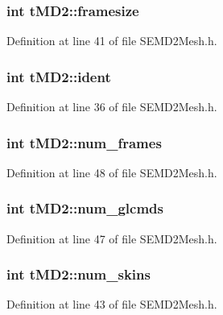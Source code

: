\subsubsection[{framesize}]{\setlength{\rightskip}{0pt plus 5cm}int t\+M\+D2\+::framesize}\label{structt_m_d2_ac5457d8a812a9b0cee6e4754f7fee091}


Definition at line 41 of file S\+E\+M\+D2\+Mesh.\+h.

\subsubsection[{ident}]{\setlength{\rightskip}{0pt plus 5cm}int t\+M\+D2\+::ident}\label{structt_m_d2_a7db5b4e818f796969146d4de078a2a7c}


Definition at line 36 of file S\+E\+M\+D2\+Mesh.\+h.

\subsubsection[{num\+\_\+frames}]{\setlength{\rightskip}{0pt plus 5cm}int t\+M\+D2\+::num\+\_\+frames}\label{structt_m_d2_aa59b41d7ca2f8f41725667978764e446}


Definition at line 48 of file S\+E\+M\+D2\+Mesh.\+h.

\subsubsection[{num\+\_\+glcmds}]{\setlength{\rightskip}{0pt plus 5cm}int t\+M\+D2\+::num\+\_\+glcmds}\label{structt_m_d2_a1b15ed51bde138562d4baf83ffc6db36}


Definition at line 47 of file S\+E\+M\+D2\+Mesh.\+h.

\subsubsection[{num\+\_\+skins}]{\setlength{\rightskip}{0pt plus 5cm}int t\+M\+D2\+::num\+\_\+skins}\label{structt_m_d2_a390b40316d985cc46e6d4f41b3d8e8e0}


Definition at line 43 of file S\+E\+M\+D2\+Mesh.\+h.

